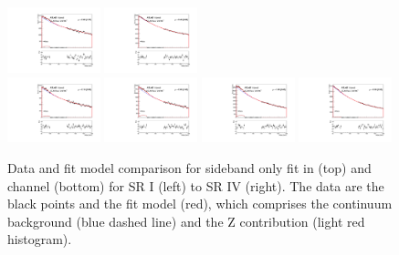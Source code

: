 \begin{figure}[htbp]
  \centering
 \includegraphics[width=0.24\textwidth]{figures/VBF/zunblind_testVBF_ICHEP_2cen_SRI.pdf}
 \includegraphics[width=0.24\textwidth]{figures/VBF/zunblind_testVBF_ICHEP_2cen_SRII.pdf}\\
 \includegraphics[width=0.24\textwidth]{figures/VBF/zunblind_testVBF_ICHEP_4cen_SRI.pdf}
 \includegraphics[width=0.24\textwidth]{figures/VBF/zunblind_testVBF_ICHEP_4cen_SRII.pdf}
 \includegraphics[width=0.24\textwidth]{figures/VBF/zunblind_testVBF_ICHEP_4cen_SRIII.pdf}
 \includegraphics[width=0.24\textwidth]{figures/VBF/zunblind_testVBF_ICHEP_4cen_SRIV.pdf}\\
\caption{Data and fit model comparison for sideband only \zjets{} fit in \twocentral (top) and \fourcentral channel (bottom) for SR I (left) to SR IV (right).  The data are the black points and the fit model (red), which comprises the continuum background (blue dashed line) and the Z contribution (light red histogram).}
  \label{fig:vbf-zsidebandfit}
\end{figure}


